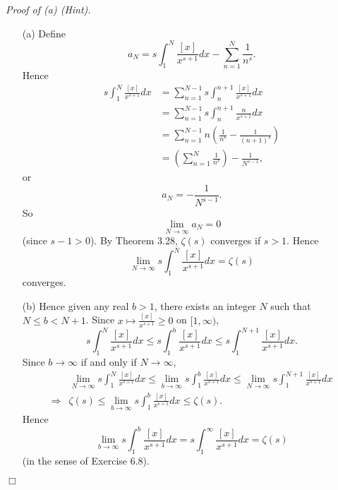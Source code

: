 \documentclass{article}
\begin{document}
\emph{Proof of (a) (Hint).}
\begin{enumerate}
  \item[(a)]
  Define
  \[
    a_N = s \int_{1}^{N} \frac{[x]}{x^{s+1}} dx - \sum_{n=1}^{N} \frac{1}{n^s}.
  \]
  Hence
  \begin{align*}
    s \int_{1}^{N} \frac{[x]}{x^{s+1}} dx
    &=
    \sum_{n=1}^{N-1} s \int_{n}^{n+1} \frac{[x]}{x^{s+1}} dx \\
    &=
    \sum_{n=1}^{N-1} s \int_{n}^{n+1} \frac{n}{x^{s+1}} dx \\
    &=
    \sum_{n=1}^{N-1} n \left( \frac{1}{n^s} - \frac{1}{(n+1)^s} \right) \\
    &=
    \left( \sum_{n=1}^N \frac{1}{n^s} \right) - \frac{1}{N^{s-1}},
  \end{align*}
  or
  \[
    a_N = -\frac{1}{N^{s-1}}.
  \]
  So
  \[
    \lim_{N \to \infty} a_N = 0
  \]
  (since $s - 1 > 0$).
  By Theorem 3.28, $\zeta(s)$ converges if $s > 1$.
  Hence
  \[
    \lim_{N \to \infty} s \int_{1}^{N} \frac{[x]}{x^{s+1}} dx = \zeta(s)
  \]
  converges.

  \item[(b)]
  Hence given any real $b > 1$, there exists an integer $N$ such that $N \leq b < N+1$.
  Since $x \mapsto \frac{[x]}{x^{s+1}} \geq 0$ on $[1,\infty)$,
  \[
    s \int_{1}^{N} \frac{[x]}{x^{s+1}} dx
    \leq
    s \int_{1}^{b} \frac{[x]}{x^{s+1}} dx
    \leq
    s \int_{1}^{N+1} \frac{[x]}{x^{s+1}} dx.
  \]
  Since $b \to \infty$ if and only if $N \to \infty$,
  \begin{align*}
    &\lim_{N \to \infty} s \int_{1}^{N} \frac{[x]}{x^{s+1}} dx
      \leq
      \lim_{b \to \infty} s \int_{1}^{b} \frac{[x]}{x^{s+1}} dx
      \leq
      \lim_{N \to \infty} s \int_{1}^{N+1} \frac{[x]}{x^{s+1}} dx \\
    \Longrightarrow&
      \zeta(s)
      \leq
      \lim_{b \to \infty} s \int_{1}^{b} \frac{[x]}{x^{s+1}} dx
      \leq
      \zeta(s).
  \end{align*}
  Hence
  \[
    \lim_{b \to \infty} s \int_{1}^{b} \frac{[x]}{x^{s+1}} dx
    = s \int_{1}^{\infty} \frac{[x]}{x^{s+1}} dx
    = \zeta(s)
  \]
  (in the sense of Exercise 6.8).
\end{enumerate}
$\Box$ \\
\end{document}
